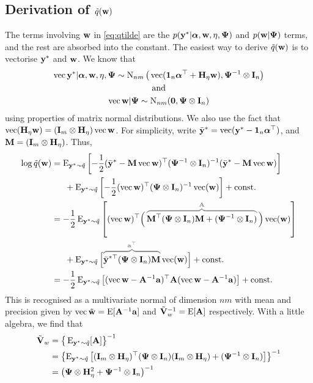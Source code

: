 \subsection{Derivation of \texorpdfstring{$\tilde q({\mathbf w})$}{$\tilde q(w)$}}

The terms involving ${\mathbf w}$ in \cref{eq:qtilde} are the $p({\mathbf y}^*|{\bm\alpha},{\mathbf w},\eta,{\bm\Psi})$ and $p({\mathbf w}|{\bm\Psi})$ terms, and the rest are absorbed into the constant.
The easiest way to derive $\tilde q({\mathbf w})$ is to vectorise ${\mathbf y}^*$ and ${\mathbf w}$.
We know that
\begin{gather*}
  \operatorname{vec} {\mathbf y}^* |  {\bm\alpha},{\mathbf w},\eta,{\bm\Psi} \sim \operatorname{N}_{nm}\big(\operatorname{vec} ({\mathbf 1}_n{\bm\alpha}^\top + {\mathbf H}_\eta{\mathbf w}), {\bm\Psi}^{-1}\otimes{\mathbf I}_n\big) \\
  \text{and}\\
  \operatorname{vec} {\mathbf w} | {\bm\Psi} \sim \operatorname{N}_{nm} ({\mathbf 0}, {\bm\Psi}\otimes{\mathbf I}_n)
\end{gather*}
using properties of matrix normal distributions.
We also use the fact that $\operatorname{vec} ({\mathbf H}_\eta{\mathbf w}) = ({\mathbf I}_m \otimes {\mathbf H}_\eta)\operatorname{vec}{\mathbf w}$.  %
For simplicity, write $\bar{{\mathbf y}}^* = \operatorname{vec}({\mathbf y}^* - {\mathbf 1}_n{\bm\alpha}^\top)$, and ${\mathbf M} = ({\mathbf I}_m \otimes {\mathbf H}_\eta)$.
Thus,
\begin{align*}
  \log \tilde q(\bw) 
  &= \E_{\by^*\sim \tilde q} \left[ 
  -\half (\bar\by^* - \bM\vecc\bw )^\top(\bPsi^{-1} \otimes \bI_n)^{-1} (\bar\by^* - \bM\vecc\bw )
  \right] \\
  &\phantom{==} + \E_{\by^*\sim \tilde q} \left[ 
  -\half (\vecc \bw )^\top(\bPsi \otimes \bI_n)^{-1} \vecc (\bw ) \right] + \const \\
  &= -\half\E_{\by^*\sim \tilde q} \left[ 
  (\vecc\bw)^\top \Big( \,
  \greyoverbrace{\bM^\top(\bPsi \otimes \bI_n)\bM + (\bPsi^{-1} \otimes \bI_n)}{\bA} 
  \, \Big) \vecc (\bw )
  \right] \\
  &\phantom{==} + \E_{\by^*\sim \tilde q} \Big[ 
  \greyoverbrace{\bar\by^{*\top} (\bPsi \otimes \bI_n) \bM}{\ba^\top} \vecc (\bw )
  \Big] + \const \\
  &= -\half\E_{\by^*\sim \tilde q} \left[
  (\vecc\bw - \bA^{-1}\ba)^\top \bA (\vecc\bw - \bA^{-1}\ba)
  \right] + \const
\end{align*}
This is recognised as a multivariate normal of dimension $nm$ with mean and precision given by $\operatorname{vec} \tilde{{\mathbf w}} = \operatorname{E}[{\mathbf A}^{-1}{\mathbf a}]$ and $\tilde{{\mathbf V}}_w ^{-1}= \operatorname{E}[{\mathbf A}]$ respectively.
With a little algebra, we find that
\begin{align*}
  \tilde{{\mathbf V}}_w 
  &= \big\{ \operatorname{E}_{{\mathbf y}^*\sim \tilde q} [{\mathbf A}] \big\}^{-1} \\
  &= \left\{ \operatorname{E}_{{\mathbf y}^*\sim \tilde q} \left[({\mathbf I}_m \otimes {\mathbf H}_\eta)^\top({\bm\Psi} \otimes {\mathbf I}_n)({\mathbf I}_m \otimes {\mathbf H}_\eta) + ({\bm\Psi}^{-1} \otimes {\mathbf I}_n) \right] \right\}^{-1} \\
  &= \big( {\bm\Psi} \otimes {\mathbf H}_\eta^2 + {\bm\Psi}^{-1} \otimes {\mathbf I}_n \big)^{-1}
\end{align*}
